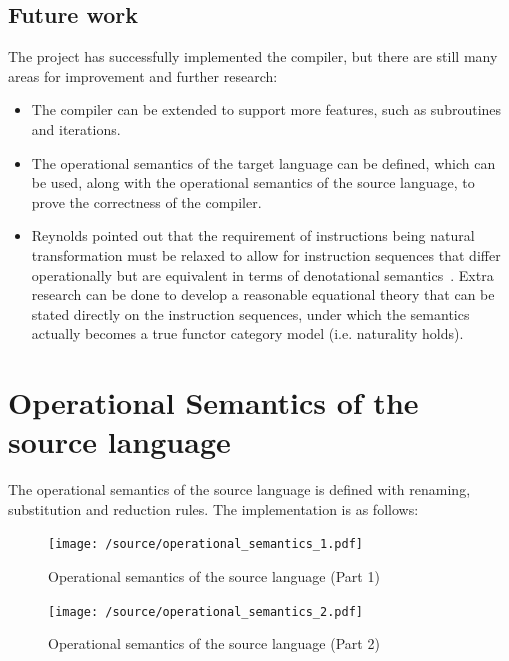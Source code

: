 \documentclass[12pt,a4paper]{report}
\theoremstyle{definition}
\begin{document}
    \section{Future work}
    The project has successfully implemented the compiler, but there are still many areas for improvement and further research:
    \begin{itemize}
        \item 
            The compiler can be extended to support more features, such as subroutines and iterations.
        \item
            The operational semantics of the target language can be defined, which can be used, along with the operational semantics of the source language, to prove the correctness of the compiler.
        \item
            Reynolds pointed out that the requirement of instructions being natural transformation must be relaxed to allow for instruction sequences that differ operationally but are equivalent in terms of denotational semantics~\autocite[Ch. 6]{Reynolds}. Extra research can be done to develop a reasonable equational theory that can be stated directly on the instruction sequences, under which the semantics actually becomes a true functor category model (i.e. naturality holds).
    \end{itemize}

\printbibliography

\appendix

\chapter{Operational Semantics of the source language} \label{app: operational_semantics}
    \minitoc
    The operational semantics of the source language is defined with renaming, substitution and reduction rules. The implementation is as follows:
    \begin{figure}[H]
        \centering
        \texttt{[image: /source/operational\_semantics\_1.pdf]}
        \caption{Operational semantics of the source language (Part 1)}
        \label{fig: operational_semantics_1}
    \end{figure}
    \begin{figure}[H]
        \centering
        \texttt{[image: /source/operational\_semantics\_2.pdf]}
        \caption{Operational semantics of the source language (Part 2)}
        \label{fig: operational_semantics_2}
    \end{figure}


\cleardoublepage
\let\cleardoublepage\clearpage
\pagestyle{empty}

\AtBeginShipoutNext{\AtBeginShipoutDiscard}
\end{document}
